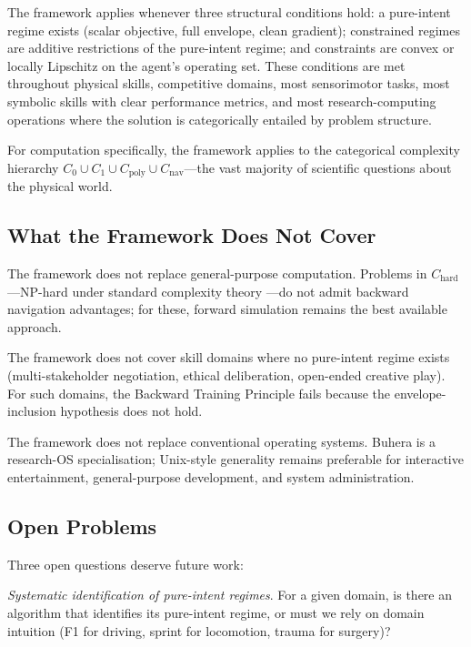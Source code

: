 \documentclass[twocolumn,11pt,a4paper]{article}
\begin{document}
The framework applies whenever three structural conditions hold: a pure-intent regime exists (scalar objective, full envelope, clean gradient); constrained regimes are additive restrictions of the pure-intent regime; and constraints are convex or locally Lipschitz on the agent's operating set. These conditions are met throughout physical skills, competitive domains, most sensorimotor tasks, most symbolic skills with clear performance metrics, and most research-computing operations where the solution is categorically entailed by problem structure.

For computation specifically, the framework applies to the categorical complexity hierarchy $C_0 \cup C_1 \cup C_{\text{poly}} \cup C_{\text{nav}}$---the vast majority of scientific questions about the physical world.

\subsection{What the Framework Does Not Cover}

The framework does not replace general-purpose computation. Problems in $C_{\text{hard}}$---NP-hard under standard complexity theory \cite{arora2009computational,sipser2012introduction}---do not admit backward navigation advantages; for these, forward simulation remains the best available approach.

The framework does not cover skill domains where no pure-intent regime exists (multi-stakeholder negotiation, ethical deliberation, open-ended creative play). For such domains, the Backward Training Principle fails because the envelope-inclusion hypothesis does not hold.

The framework does not replace conventional operating systems. Buhera is a research-OS specialisation; Unix-style generality remains preferable for interactive entertainment, general-purpose development, and system administration.

\subsection{Open Problems}

Three open questions deserve future work:

\emph{Systematic identification of pure-intent regimes}. For a given domain, is there an algorithm that identifies its pure-intent regime, or must we rely on domain intuition (F1 for driving, sprint for locomotion, trauma for surgery)?
\end{document}
